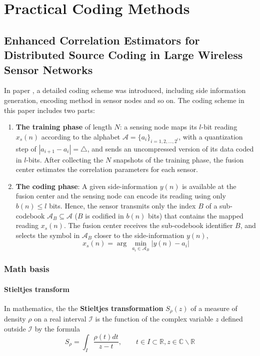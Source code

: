 \chapter{Practical Coding Methods}

\section{Enhanced Correlation Estimators for Distributed Source Coding in Large Wireless Sensor Networks}
In paper \cite{Enric2012}, a detailed coding scheme was introduced, including side information generation, encoding method in sensor nodes and so on. The coding scheme in this paper includes two parts: 
\begin{enumerate}
    \item \textbf{\textcolor[rgb]{1,0,0}{The training phase}} of length $N$: a sensing node maps its $l$-bit reading $x_s(n)$ according to the alphabet $\mathcal{A} = \{ a_i \}_{i=1,2,\dots,2^l}$, with a quantization step of $\left| a_{i+1} - a_i \right| = \triangle$, and sends an uncompressed version of its data coded in $l$-bits. After collecting the $N$ snapshots of the training phase, the fusion center estimates the correlation parameters for each sensor.
    \item \textbf{\textcolor[rgb]{1,0,0}{The coding phase}}: A given side-information $y(n)$ is available at the fusion center and the sensing node can encode its reading using only $b(n) \leq l$ bits. Hence, the sensor transmits only the index $B$ of a sub-codebook $\mathcal{A}_B \subseteq \mathcal{A}$ ($B$ is codified in $b(n)$ bits) that contains the mapped reading $x_s(n)$. The fusion center receives the sub-codebook identifier $B$, and selects the symbol in $\mathcal{A}_B$ closer to the side-information $y(n)$,
        \begin{equation}
            x_s(n) = \arg\ \min_{a_i \in \mathcal{A}_B} \left| y(n)-a_i \right|
            \label{eq-subcode}
        \end{equation}
\end{enumerate}

\subsection{Math basis}
\subsubsection{Stieltjes transform}
In mathematics, the the \textbf{\textcolor[rgb]{1,0,0}{Stieltjes transformation}} $S_{\rho}(z)$ of a measure of density $\rho$ on a real interval $\mathcal{I}$ is the function of the complex variable $z$ defined outside $\mathcal{I}$ by the formula
\begin{equation}
    S_{\rho} = \int_I \dfrac{\rho(t) dt}{z-t}, \qquad t \in I \subset \mathbb{R}, z\in \mathbb{C} \backslash \mathbb{R}
    \label{eq-Stieltjes}
\end{equation}

